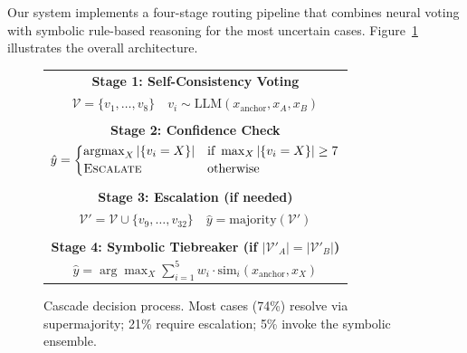 \documentclass[11pt]{article}
\begin{document}
Our system implements a four-stage routing pipeline that combines neural voting with symbolic rule-based reasoning for the most uncertain cases. Figure~\ref{fig:architecture} illustrates the overall architecture.

\begin{figure}[!htb]
\centering
\small
\setlength{\tabcolsep}{3pt}
\begin{tabular}{c}
\textbf{Stage 1: Self-Consistency Voting} \\[4pt]
$\mathcal{V} = \{v_1, \ldots, v_8\} \quad v_i \sim \text{LLM}(x_{\text{anchor}}, x_A, x_B)$ \\[6pt]
\hline \\[-6pt]
\textbf{Stage 2: Confidence Check} \\[6pt]
{\scriptsize$\hat{y} = \left\{
\begin{array}{@{}ll@{}}
\operatorname*{argmax}_{X} |\{v_i = X\}| & \text{if } \max_X |\{v_i = X\}| \geq 7 \\[2pt]
\textsc{Escalate} & \text{otherwise}
\end{array}
\right.$} \\[12pt]
\hline \\[-6pt]
\textbf{Stage 3: Escalation (if needed)} \\[4pt]
$\mathcal{V}' = \mathcal{V} \cup \{v_9, \ldots, v_{32}\} \quad \hat{y} = \text{majority}(\mathcal{V}')$ \\[6pt]
\hline \\[-6pt]
\textbf{Stage 4: Symbolic Tiebreaker (if $|\mathcal{V}'_A| = |\mathcal{V}'_B|$)} \\[4pt]
$\hat{y} = \arg\max_X \sum_{i=1}^{5} w_i \cdot \text{sim}_i(x_{\text{anchor}}, x_X)$
\end{tabular}

\vspace{6pt}
\caption{Cascade decision process. Most cases (74\%) resolve via supermajority; 21\% require escalation; 5\% invoke the symbolic ensemble.}
\label{fig:architecture}
\end{figure}
\end{document}
